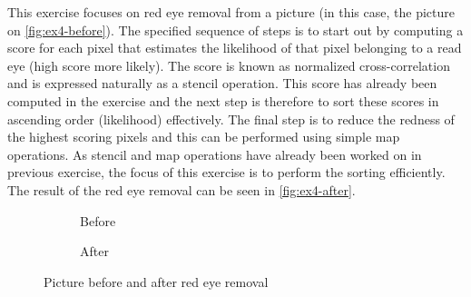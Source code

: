 This exercise focuses on red eye removal from a picture (in this case, the picture on \autoref{fig:ex4-before}).
The specified sequence of steps is to start out by computing a score for each pixel that estimates the likelihood of that pixel belonging to a read eye (high score more likely).
The score is known as normalized cross-correlation and is expressed naturally as a stencil operation.
This score has already been computed in the exercise and the next step is therefore to sort these scores in ascending order (likelihood) effectively.
The final step is to reduce the redness of the highest scoring pixels and this can be performed using simple map operations.
As stencil and map operations have already been worked on in previous exercise, the focus of this exercise is to perform the sorting efficiently.
The result of the red eye removal can be seen in \autoref{fig:ex4-after}.
\begin{figure}[ht]
	\centering
	\begin{subfigure}{.5\textwidth}
		\centering
		\caption{Before}
		\label{fig:ex4-before}
	\end{subfigure}%
	\begin{subfigure}{.5\textwidth}
		\centering
		\caption{After}
		\label{fig:ex4-after}
	\end{subfigure}
	\caption{Picture before and after red eye removal}
	\label{fig:ex4}
\end{figure}

